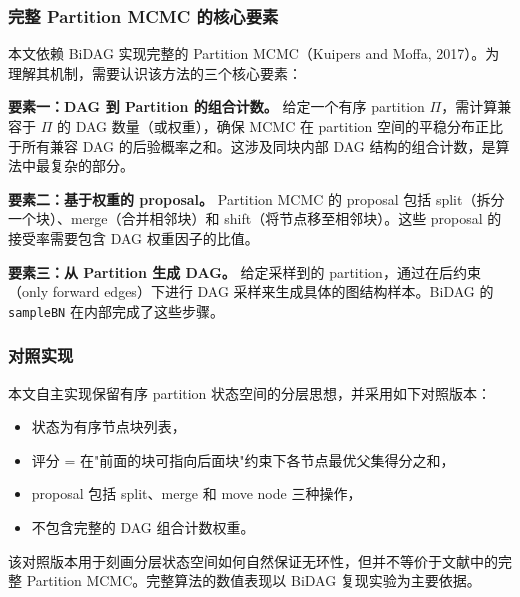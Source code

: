 \documentclass[UTF8,a4paper,12pt]{ctexart}
\newenvironment{algorithmic}[1][]{\begin{list}{}{\leftmargin=1.5em\itemsep=0.2em}}{\end{list}}
\newcommand{\Require}{\item[\textbf{输入:}]}
\newcommand{\Ensure}{\item[\textbf{输出:}]}
\newcommand{\State}{\item}
\newcommand{\If}[1]{\item \textbf{if} ##1 \textbf{then}}
\newcommand{\ElsIf}[1]{\item \textbf{else if} ##1 \textbf{then}}
\newcommand{\EndIf}{\item \textbf{end if}}
\begin{document}
\subsubsection{完整 Partition MCMC 的核心要素}

本文依赖 BiDAG 实现完整的 Partition MCMC（Kuipers and Moffa, 2017）。为理解其机制，需要认识该方法的三个核心要素：

\textbf{要素一：DAG 到 Partition 的组合计数。} 给定一个有序 partition $\Pi$，需计算兼容于 $\Pi$ 的 DAG 数量（或权重），确保 MCMC 在 partition 空间的平稳分布正比于所有兼容 DAG 的后验概率之和。这涉及同块内部 DAG 结构的组合计数，是算法中最复杂的部分。

\textbf{要素二：基于权重的 proposal。} Partition MCMC 的 proposal 包括 split（拆分一个块）、merge（合并相邻块）和 shift（将节点移至相邻块）。这些 proposal 的接受率需要包含 DAG 权重因子的比值。

\textbf{要素三：从 Partition 生成 DAG。} 给定采样到的 partition，通过在后约束（only forward edges）下进行 DAG 采样来生成具体的图结构样本。BiDAG 的 \texttt{sampleBN} 在内部完成了这些步骤\citep{suter2023bidag}。

\subsubsection{对照实现}

本文自主实现保留有序 partition 状态空间的分层思想，并采用如下对照版本：
\begin{itemize}
  \item 状态为有序节点块列表，
  \item 评分 = 在"前面的块可指向后面块"约束下各节点最优父集得分之和，
  \item proposal 包括 split、merge 和 move node 三种操作，
  \item 不包含完整的 DAG 组合计数权重。
\end{itemize}

该对照版本用于刻画分层状态空间如何自然保证无环性，但并不等价于文献中的完整 Partition MCMC。完整算法的数值表现以 BiDAG 复现实验为主要依据。

\end{document}
